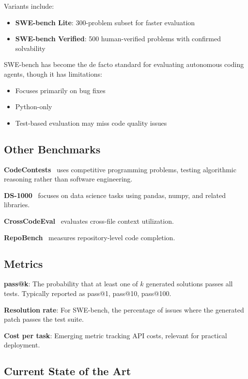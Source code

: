 Variants include:
\begin{itemize}
    \item \textbf{SWE-bench Lite}: 300-problem subset for faster evaluation
    \item \textbf{SWE-bench Verified}: 500 human-verified problems with confirmed solvability
\end{itemize}

SWE-bench has become the de facto standard for evaluating autonomous coding agents, though it has limitations:
\begin{itemize}
    \item Focuses primarily on bug fixes
    \item Python-only
    \item Test-based evaluation may miss code quality issues
\end{itemize}

\subsection{Other Benchmarks}

\textbf{CodeContests}~\citep{li2022codeforces} uses competitive programming problems, testing algorithmic reasoning rather than software engineering.

\textbf{DS-1000}~\citep{lai2022ds1000} focuses on data science tasks using pandas, numpy, and related libraries.

\textbf{CrossCodeEval}~\citep{ding2023crosscodeeval} evaluates cross-file context utilization.

\textbf{RepoBench}~\citep{liu2023repobench} measures repository-level code completion.

\subsection{Metrics}

\textbf{pass@k}: The probability that at least one of $k$ generated solutions passes all tests. Typically reported as pass@1, pass@10, pass@100.

\textbf{Resolution rate}: For SWE-bench, the percentage of issues where the generated patch passes the test suite.

\textbf{Cost per task}: Emerging metric tracking API costs, relevant for practical deployment.

\subsection{Current State of the Art}

